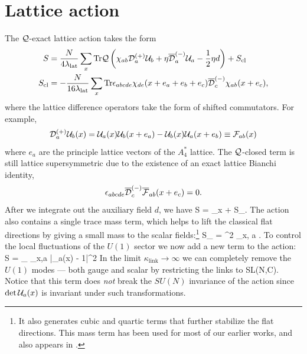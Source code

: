 \section{Lattice action}
%
The $\mathcal Q$-exact lattice action takes the form
\begin{align}
  S & = \frac{N}{4\lambda_{\text{lat}}} \sum_x \mathrm{Tr}{\mathcal Q \left(\chi_{ab}\mathcal D_a^{(+)}\mathcal U_b + \eta {\overline{\cal D}}_a^{(-)}\mathcal U_a 
- \frac{1}{2}\eta d \right)} + S_{\text{cl}}  \\
  S_{\text{cl}} & = -\frac{N}{16\lambda_{\text{lat}}} \sum_x \mathrm{Tr}{\epsilon_{abcde} \chi_{de}(x + e_a + e_b + e_c) 
{\overline{\cal D}}^{(-)}_{c} \chi_{ab}(x + e_c)},
\label{susyaction}
\end{align}
where the lattice difference operators take the form of shifted commutators.
For example,
\begin{equation}
  \mathcal D_a^{(+)} \mathcal U_b(x) = \mathcal U_a(x) \mathcal U_b(x + e_a) - \mathcal U_b(x) \mathcal U_a(x + e_b) \equiv {\cal F}_{ab}(x)
\end{equation}
where $e_a$ are the principle lattice vectors of the $A_4^*$ lattice.
The $\mathcal Q$-closed term is still lattice supersymmetric due to the existence of an exact lattice Bianchi identity,
\begin{equation}
\epsilon_{abcde} {\overline{\cal D}}^{(-)}_c {\overline{\cal F}}_{ab}(x + e_c) = 0.
\end{equation}
After we integrate out the auxiliary field $d$, we have 
\beq
\label{eq:lat_act}
S  =  \sum_x   + S_{}.
\eeq
The action also contains a single trace mass term, which helps to lift the classical flat directions by giving a small
mass to the scalar fields:\footnote{It also generates cubic and quartic terms that further stabilize the flat directions.
This mass term has been used for most of our earlier works, and also appears in \cite{Hanada:2010qg}.}
\beq
  \label{eq:single_trace}
  S_{} =  \mu^2 \sum_{x, a} .
\eeq
To control the local fluctuations of the $U(1)$ sector we now add a new term to the action:
\beq
\Delta S =  \kappa_ \sum_{x,a} |\det \cU_a(x) - 1|^2
\label{det}
\eeq
In the limit $\kappa_\text{link}\to\infty$ we can completely remove the $U(1)$ modes --- both gauge and scalar
by restricting the links to SL(N,C). Notice that this term does {\it not} break the $SU(N)$ invariance of the
action since $\det \mathcal U_a(x)$ is invariant under such transformations.
